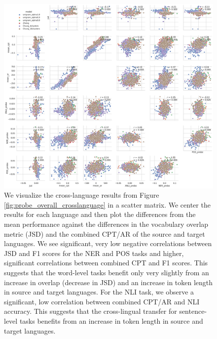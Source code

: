\begin{figure}[H]
    \centering
    \includegraphics[width=\textwidth]{figures/probe_detailed_crosslanguage_scattermatrix.pdf}
    \caption{We visualize the cross-language results from Figure \ref{fig:probe_overall_crosslanguage} in a scatter matrix. We center the results for each language and then plot the differences from the mean performance against the differences in the vocabulary overlap metric (JSD) and the combined CPT/AR of the source and target languages. We see significant, very low negative correlations between JSD and F1 scores for the NER and POS tasks and higher, significant correlations between combined CPT and F1 scores. This suggests that the word-level tasks benefit only very slightly from an increase in overlap (decrease in JSD) and an increase in token length in source and target languages. For the NLI task, we observe a significant, low correlation between combined CPT/AR and NLI accuracy. This suggests that the cross-lingual transfer for sentence-level tasks benefits from an increase in token length in source and target languages.}
    \label{fig:probe_overall_crosslanguage_scattermatrix}
\end{figure}



